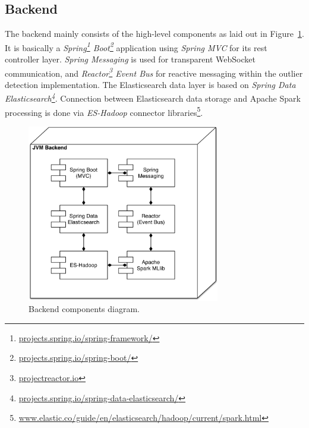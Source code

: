 \subsection{Backend}

The backend mainly consists of the high-level components as laid out in Figure~\ref{fig:backend-components}.
It is basically a \emph{Spring\footnote{\textcolor{blue}{\href{projects.spring.io/spring-framework/}{projects.spring.io/spring-framework/}}} Boot\footnote{\textcolor{blue}{\href{https://projects.spring.io/spring-boot/}{projects.spring.io/spring-boot/}}}} application using \emph{Spring MVC} for its \gls{rest} controller layer.
\emph{Spring Messaging} is used for transparent WebSocket communication, and \emph{Reactor\footnote{\textcolor{blue}{\href{https://projectreactor.io/}{projectreactor.io}}} Event Bus} for reactive messaging within the outlier detection implementation.
The Elasticsearch data layer is based on \emph{Spring Data Elasticsearch\footnote{\textcolor{blue}{\href{http://projects.spring.io/spring-data-elasticsearch/}{projects.spring.io/spring-data-elasticsearch/}}}}.
Connection between Elasticsearch data storage and Apache Spark processing is done via \emph{ES-Hadoop} connector libraries\footnote{\textcolor{blue}{\href{https://www.elastic.co/guide/en/elasticsearch/hadoop/current/spark.html}{www.elastic.co/guide/en/elasticsearch/hadoop/current/spark.html}}}.

\begin{figure}[h]
  \centering
  \includegraphics[width=0.75\textwidth]{figures/architecture/backend-components}
  \caption{Backend components diagram.}
  \label{fig:backend-components}
\end{figure}

